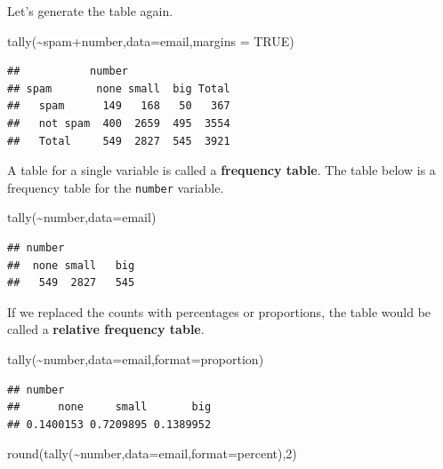 \documentclass[
]{book}
\newenvironment{Shaded}{\begin{snugshade}}{\end{snugshade}}
\newcommand{\AttributeTok}[1]{\textcolor[rgb]{0.77,0.63,0.00}{#1}}
\newcommand{\ConstantTok}[1]{\textcolor[rgb]{0.00,0.00,0.00}{#1}}
\newcommand{\DecValTok}[1]{\textcolor[rgb]{0.00,0.00,0.81}{#1}}
\newcommand{\FunctionTok}[1]{\textcolor[rgb]{0.00,0.00,0.00}{#1}}
\newcommand{\NormalTok}[1]{#1}
\newcommand{\SpecialCharTok}[1]{\textcolor[rgb]{0.00,0.00,0.00}{#1}}
\newcommand{\StringTok}[1]{\textcolor[rgb]{0.31,0.60,0.02}{#1}}
\begin{document}
Let's generate the table again.

\begin{Shaded}
\begin{Highlighting}[]
\FunctionTok{tally}\NormalTok{(}\SpecialCharTok{\textasciitilde{}}\NormalTok{spam}\SpecialCharTok{+}\NormalTok{number,}\AttributeTok{data=}\NormalTok{email,}\AttributeTok{margins =} \ConstantTok{TRUE}\NormalTok{)}
\end{Highlighting}
\end{Shaded}

\begin{verbatim}
##           number
## spam       none small  big Total
##   spam      149   168   50   367
##   not spam  400  2659  495  3554
##   Total     549  2827  545  3921
\end{verbatim}

A table for a single variable is called a \textbf{frequency table}. The table below is a frequency table for the \texttt{number} variable.

\begin{Shaded}
\begin{Highlighting}[]
\FunctionTok{tally}\NormalTok{(}\SpecialCharTok{\textasciitilde{}}\NormalTok{number,}\AttributeTok{data=}\NormalTok{email)}
\end{Highlighting}
\end{Shaded}

\begin{verbatim}
## number
##  none small   big 
##   549  2827   545
\end{verbatim}

If we replaced the counts with percentages or proportions, the table would be called a \textbf{relative frequency table}.

\begin{Shaded}
\begin{Highlighting}[]
\FunctionTok{tally}\NormalTok{(}\SpecialCharTok{\textasciitilde{}}\NormalTok{number,}\AttributeTok{data=}\NormalTok{email,}\AttributeTok{format=}\StringTok{\textquotesingle{}proportion\textquotesingle{}}\NormalTok{)}
\end{Highlighting}
\end{Shaded}

\begin{verbatim}
## number
##      none     small       big 
## 0.1400153 0.7209895 0.1389952
\end{verbatim}

\begin{Shaded}
\begin{Highlighting}[]
\FunctionTok{round}\NormalTok{(}\FunctionTok{tally}\NormalTok{(}\SpecialCharTok{\textasciitilde{}}\NormalTok{number,}\AttributeTok{data=}\NormalTok{email,}\AttributeTok{format=}\StringTok{\textquotesingle{}percent\textquotesingle{}}\NormalTok{),}\DecValTok{2}\NormalTok{)}
\end{Highlighting}
\end{Shaded}
\end{document}
